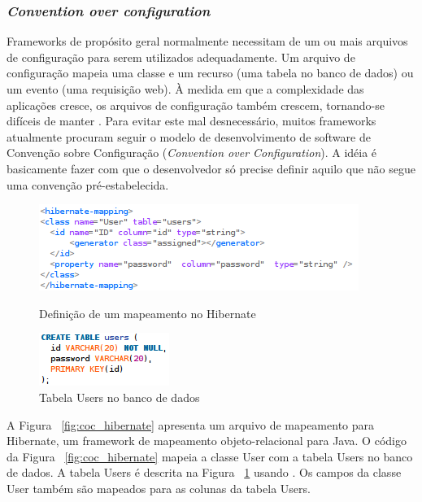 \subsubsection{\emph{Convention over configuration}}
Frameworks de propósito geral normalmente necessitam de um ou mais arquivos de configuração
para serem utilizados adequadamente. Um arquivo de configuração mapeia uma classe e um recurso (uma tabela
no banco de dados) ou um evento (uma requisição web). À medida em que a complexidade das
aplicações cresce, os arquivos de configuração também crescem, tornando-se difíceis de manter \cite{Chen}. 
Para evitar este mal desnecessário, muitos frameworks atualmente procuram seguir o modelo
de desenvolvimento de software de Convenção sobre Configuração (\emph{Convention over Configuration}).
A idéia é basicamente fazer com que o desenvolvedor só precise definir aquilo que não segue 
uma convenção pré-estabelecida. 

\begin{figure}[!htbp]
\begin{minipage}[t]{0.5\linewidth}
\includegraphics[scale=0.75]{fig/coc_hibernate.png}
\caption{Definição de um mapeamento no Hibernate}\label{fig:coc_hibernate}
\end{minipage} \hfill
\begin{minipage}[t]{0.3\linewidth}
\includegraphics[scale=0.75]{fig/coc_tabela.png}
\caption{Tabela Users no banco de dados}\label{fig:coc_tabela}
\end{minipage}
\end{figure}

A Figura ~\ref{fig:coc_hibernate} apresenta um arquivo de mapeamento para Hibernate,
um framework de mapeamento objeto-relacional para Java. O código da Figura ~\ref{fig:coc_hibernate}
mapeia a classe User com a tabela Users no banco de dados. A tabela Users é descrita 
na Figura ~\ref{fig:coc_tabela} usando . Os campos da classe User também são mapeados
para as colunas da tabela Users.

